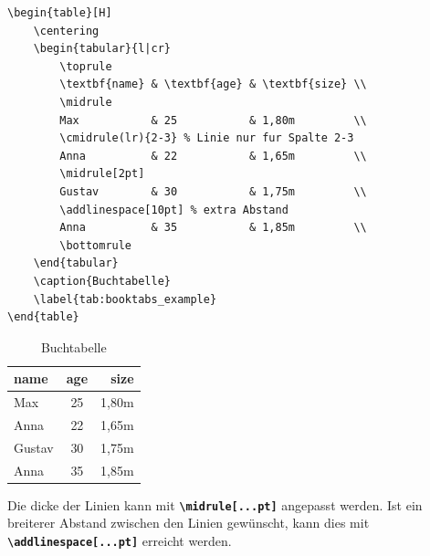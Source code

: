 \begin{minipage}{0.70\textwidth}
    \begin{lstlisting}[language={[LaTeX]TeX}, basicstyle=\small]
\begin{table}[H]
    \centering
    \begin{tabular}{l|cr}
        \toprule
        \textbf{name} & \textbf{age} & \textbf{size} \\
        \midrule
        Max           & 25           & 1,80m         \\
        \cmidrule(lr){2-3} % Linie nur fur Spalte 2-3
        Anna          & 22           & 1,65m         \\
        \midrule[2pt]
        Gustav        & 30           & 1,75m         \\
        \addlinespace[10pt] % extra Abstand 
        Anna          & 35           & 1,85m         \\
        \bottomrule
    \end{tabular}
    \caption{Buchtabelle}
    \label{tab:booktabs_example}
\end{table}
    \end{lstlisting}
\end{minipage}
\hfill
\begin{minipage}{0.3\textwidth}
    \begin{table}[H]
        \centering
        \begin{tabular}{l|cr}
            \toprule
            \textbf{name} & \textbf{age} & \textbf{size} \\
            \midrule
            Max           & 25           & 1,80m         \\
            \cmidrule(lr){2-3}  %
            Anna          & 22           & 1,65m         \\
            \midrule[2pt]
            Gustav        & 30           & 1,75m         \\
            \addlinespace[10pt] %
            Anna          & 35           & 1,85m         \\
            \bottomrule
        \end{tabular}
        \caption{Buchtabelle}
        \label{tab:booktabs_example}
    \end{table}
\end{minipage}

Die dicke der Linien kann mit \textbf{\texttt{\textbackslash midrule[...pt]}} angepasst werden. Ist ein breiterer Abstand zwischen den Linien gewünscht, kann dies mit \textbf{\texttt{\textbackslash addlinespace[...pt]}} erreicht werden.

